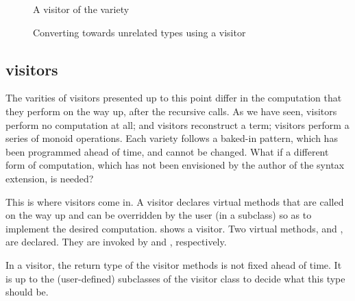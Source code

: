 \documentclass[11pt,a4paper,twoside]{article}
\begin{document}

\begin{figure}[p]
\vspace{-\baselineskip}
\caption{A visitor of the \fold variety}
\label{fig:expr00fold}
\end{figure}

\begin{figure}[p]
\caption{Converting towards unrelated types using a \fold visitor}
\label{fig:fold}
\end{figure}

\subsection{\fold visitors}
\label{sec:intro:fold}

The varities of visitors presented up to this point differ in the computation
that they perform on the way up, after the recursive calls. As we have seen,
\iter visitors perform no computation at all; \map and \mapendo visitors
reconstruct a term; \reduce visitors perform a series of monoid operations.
Each variety follows a baked-in pattern, which has been programmed ahead of
time, and cannot be changed. What if a different form of computation, which
has not been envisioned by the author of the \visitors syntax extension, is
needed?

This is where \fold visitors come in. A \fold visitor declares virtual methods
that are called on the way up and can be overridden by the user (in a
subclass) so as to implement the desired computation. 
shows a \fold visitor. Two virtual methods, 
and , are declared. They are invoked by
 and , respectively.

In a \fold visitor, the return type of the visitor methods is not fixed ahead
of time. It is up to the (user-defined) subclasses of the visitor class to
decide what this type should be.
\end{document}
